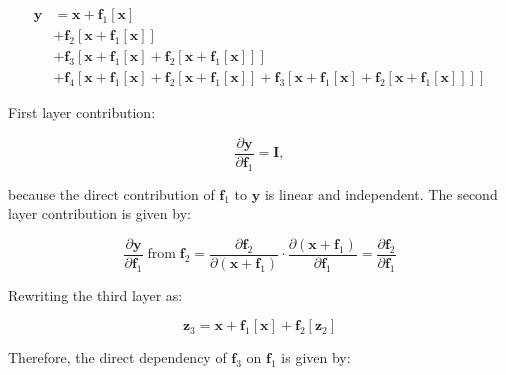 \documentclass[12pt]{report}
\begin{document}
\begin{align*}
    \mathbf{y} & = \mathbf{x} + \mathbf{f}_{1}[\mathbf{x}]                                                                                                                                                                                               \\
               & + \mathbf{f}_{2}[\mathbf{x} + \mathbf{f}_{1}[\mathbf{x}]]                                                                                                                                                                               \\
               & + \mathbf{f}_{3}[\mathbf{x} + \mathbf{f}_{1}[\mathbf{x}] + \mathbf{f}_{2}[\mathbf{x} + \mathbf{f}_{1}[\mathbf{x}]]]                                                                                                                     \\
               & + \mathbf{f}_{4}[\mathbf{x} + \mathbf{f}_{1}[\mathbf{x}] + \mathbf{f}_{2}[\mathbf{x} + \mathbf{f}_{1}[\mathbf{x}]] + \mathbf{f}_{3}[\mathbf{x} + \mathbf{f}_{1}[\mathbf{x}] + \mathbf{f}_{2}[\mathbf{x} + \mathbf{f}_{1}[\mathbf{x}]]]]
    \label{eq:11.5}
    \tag{11.5}
\end{align*}

First layer contribution:

\begin{equation*}
    \frac{\partial \mathbf{y}}{\partial \mathbf{f}_{1}} = \mathbf{I},
\end{equation*}

because the direct contribution of $\mathbf{f}_{1}$ to $\mathbf{y}$ is linear and independent. The second layer contribution is given by:

\begin{equation*}
    \frac{\partial \mathbf{y}}{\partial \mathbf{f}_{1}} \; \text{from} \; \mathbf{f}_{2} = \frac{\partial \mathbf{f}_{2}}{\partial (\mathbf{x}+\mathbf{f}_{1})} \cdot \frac{\partial (\mathbf{x}+\mathbf{f}_{1})}{\partial \mathbf{f}_{1}}=\frac{\partial \mathbf{f}_{2}}{\partial \mathbf{f}_{1}}
\end{equation*}

\null
Rewriting the third layer as:

\begin{equation*}
    \mathbf{z}_{3} = \mathbf{x} + \mathbf{f}_{1}[\mathbf{x}] + \mathbf{f}_{2}[\mathbf{z}_{2}]
\end{equation*}

Therefore, the direct dependency of $\mathbf{f}_{3}$ on $\mathbf{f}_{1}$ is given by:
\end{document}
